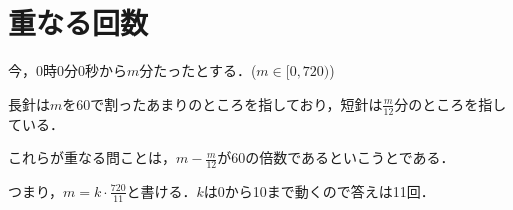 \section{重なる回数}
今，0時0分0秒から$m$分たったとする．($m \in [0, 720)$)
  
  長針は$m$を60で割ったあまりのところを指しており，短針は$\frac{m}{12}$分のところを指している．
  
  これらが重なる問ことは，$m - \frac{m}{12}$が60の倍数であるといこうとである．
  
  つまり，$m = k\cdot \frac{720}{11}$と書ける．$k$は0から10まで動くので答えは11回．
  
